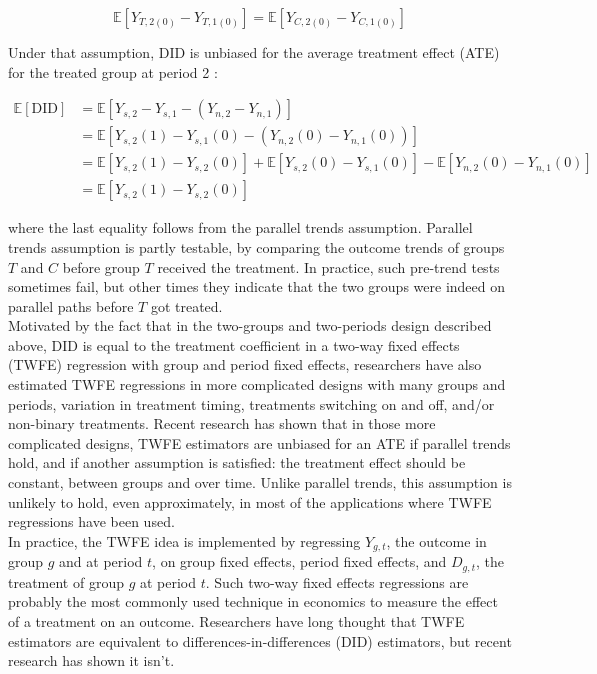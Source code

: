\documentclass[10pt, oneside]{book}
\begin{document}
$$ \mathbb{E}[Y_{T,2(0)} - Y_{T,1(0)}] = \mathbb{E}[Y_{C,2(0)} - Y_{C,1(0)}]$$

Under that assumption, DID is unbiased for the average treatment effect (ATE) for the treated group at period 2 \citep{abadie2005semiparametric}:  

\begin{equation}
\begin{aligned}
\mathbb{E}[\text{DID}] &= \mathbb{E}[Y_{s,2} - Y_{s,1} - (Y_{n,2} - Y_{n,1})] \\
&= \mathbb{E}[Y_{s,2}(1) - Y_{s,1}(0) - (Y_{n,2}(0) - Y_{n,1}(0))] \\
&= \mathbb{E}[Y_{s,2}(1) - Y_{s,2}(0)] + \mathbb{E}[Y_{s,2}(0) - Y_{s,1}(0)] - \mathbb{E}[Y_{n,2}(0) - Y_{n,1}(0)] \\
&= \mathbb{E}[Y_{s,2}(1) - Y_{s,2}(0)]
\end{aligned}
\end{equation}

where the last equality follows from the parallel trends assumption. Parallel trends assumption is partly testable, by comparing the outcome trends of groups $T$ and $C$ before group $T$ received the treatment. In practice, such pre-trend tests sometimes fail, but other times they indicate that the two groups were indeed on parallel paths before $T$ got treated. \\

Motivated by the fact that in the two-groups and two-periods design described above, DID is equal to the treatment coefficient in a two-way fixed effects (TWFE) regression with group and period fixed effects, researchers have also estimated TWFE regressions in more complicated designs with many groups and periods, variation in treatment timing, treatments switching on and off, and/or non-binary treatments. Recent research has shown that in those more complicated designs, TWFE estimators are unbiased for an ATE if parallel trends hold, and if another assumption is satisfied: the treatment effect should be constant, between groups and over time. Unlike parallel trends, this assumption is unlikely to hold, even approximately, in most of the applications where TWFE regressions have been used. \\

In practice, the TWFE idea is implemented by regressing $Y_{g,t}$, the outcome in group $g$ and at period $t$, on group fixed effects, period fixed effects, and $D_{g,t}$, the treatment of group $g$ at period $t$. Such two-way fixed effects regressions are probably the most commonly used technique in economics to measure the effect of a treatment on an outcome. Researchers have long thought that TWFE estimators are equivalent to differences-in-differences (DID) estimators, but recent research has shown it isn't. \\
\end{document}
